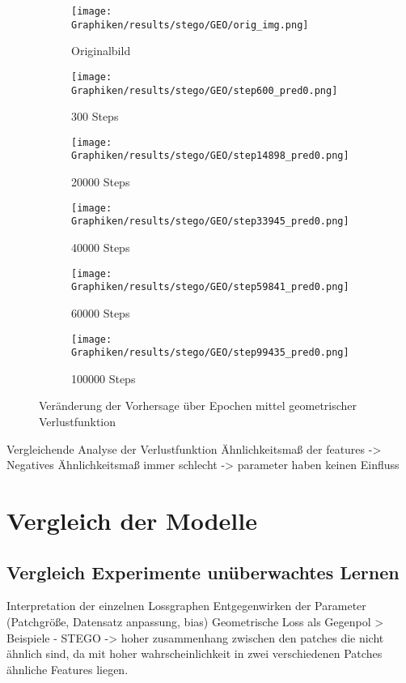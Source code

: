     \begin{figure}[h!]
        \begin{subfigure}[h]{0.3\linewidth}
            \texttt{[image: Graphiken/results/stego/GEO/orig\_img.png]}
            \caption{ Originalbild}
        \end{subfigure}
        \hfill
        \begin{subfigure}[h]{0.3\linewidth}
            \texttt{[image: Graphiken/results/stego/GEO/step600\_pred0.png]}
            \caption{300 Steps}
        \end{subfigure}%
        \hfill
        \begin{subfigure}[h]{0.3\linewidth}
            \texttt{[image: Graphiken/results/stego/GEO/step14898\_pred0.png]}
            \caption{20000 Steps}
        \end{subfigure}%
        \hfill
        \begin{subfigure}[h]{0.3\linewidth}
            \texttt{[image: Graphiken/results/stego/GEO/step33945\_pred0.png]}
            \caption{40000 Steps}
        \end{subfigure}%
        \hfill
        \begin{subfigure}[h]{0.3\linewidth}
            \texttt{[image: Graphiken/results/stego/GEO/step59841\_pred0.png]}
            \caption{60000 Steps}
        \end{subfigure}%
        \hfill
        \begin{subfigure}[h]{0.3\linewidth}
            \texttt{[image: Graphiken/results/stego/GEO/step99435\_pred0.png]}
            \caption{100000 Steps}
        \end{subfigure}%
        \caption{Veränderung der Vorhersage über Epochen mittel geometrischer Verlustfunktion}
        \label{fig:stego_geo_iter}
    \end{figure} 


    
     Vergleichende Analyse der Verlustfunktion
     Ähnlichkeitsmaß der features  
     -> Negatives Ähnlichkeitsmaß immer schlecht -> parameter haben keinen Einfluss


\section{Vergleich der Modelle}
\label{sec:results_comparison_models}

\subsection{Vergleich Experimente unüberwachtes Lernen}
   Interpretation der einzelnen Lossgraphen 
   Entgegenwirken der Parameter (Patchgröße, Datensatz anpassung, bias)
   Geometrische Loss als Gegenpol > Beispiele 
- STEGO -> hoher zusammenhang zwischen den patches die nicht ähnlich sind, da mit hoher wahrscheinlichkeit in zwei verschiedenen Patches ähnliche Features liegen.  

